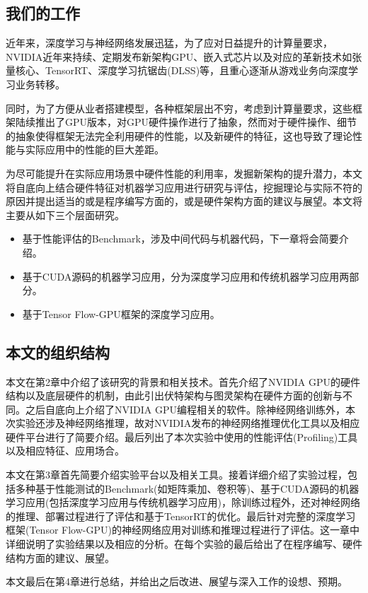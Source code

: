 \subsection{我们的工作}
\par 近年来，深度学习与神经网络发展迅猛，为了应对日益提升的计算量要求，NVIDIA近年来持续、定期发布新架构GPU、嵌入式芯片以及对应的革新技术如张量核心、TensorRT、深度学习抗锯齿(DLSS)等，且重心逐渐从游戏业务向深度学习业务转移。
\par 同时，为了方便从业者搭建模型，各种框架层出不穷，考虑到计算量要求，这些框架陆续推出了GPU版本，对GPU硬件操作进行了抽象，然而对于硬件操作、细节的抽象使得框架无法完全利用硬件的性能，以及新硬件的特征，这也导致了理论性能与实际应用中的性能的巨大差距。
\par 为尽可能提升在实际应用场景中硬件性能的利用率，发掘新架构的提升潜力，本文将自底向上结合硬件特征对机器学习应用进行研究与评估，挖掘理论与实际不符的原因并提出适当的或是程序编写方面的，或是硬件架构方面的建议与展望。本文将主要从如下三个层面研究。
\begin{itemize}
	\item 基于性能评估的Benchmark，涉及中间代码与机器代码，下一章将会简要介绍。
	\item 基于CUDA源码的机器学习应用，分为深度学习应用和传统机器学习应用两部分。
	\item 基于Tensor Flow-GPU框架的深度学习应用。
\end{itemize}

\subsection{本文的组织结构}
\par 本文在第2章中介绍了该研究的背景和相关技术。首先介绍了NVIDIA GPU的硬件结构以及底层硬件的机制，由此引出伏特架构与图灵架构在硬件方面的创新与不同。之后自底向上介绍了NVIDIA GPU编程相关的软件。除神经网络训练外，本次实验还涉及神经网络推理，故对NVIDIA发布的神经网络推理优化工具以及相应硬件平台进行了简要介绍。最后列出了本次实验中使用的性能评估(Profiling)工具以及相应特征、应用场合。
\par 本文在第3章首先简要介绍实验平台以及相关工具。接着详细介绍了实验过程，包括多种基于性能测试的Benchmark(如矩阵乘加、卷积等)、基于CUDA源码的机器学习应用(包括深度学习应用与传统机器学习应用)，除训练过程外，还对神经网络的推理、部署过程进行了评估和基于TensorRT的优化。最后针对完整的深度学习框架(Tensor Flow-GPU)的神经网络应用对训练和推理过程进行了评估。这一章中详细说明了实验结果以及相应的分析。在每个实验的最后给出了在程序编写、硬件结构方面的建议、展望。
\par 本文最后在第4章进行总结，并给出之后改进、展望与深入工作的设想、预期。

